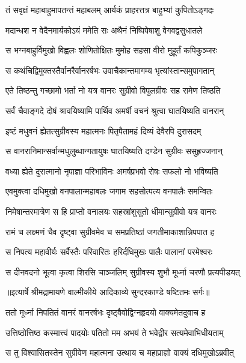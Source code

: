\twolineshloka
{तं सवृक्षं महाबाहुमापतन्तं महाबलम्}
{आर्यकं प्राहरत्तत्र बाहुभ्यां कुपितोऽङ्गदः} %

\twolineshloka
{मदान्धश न वेदैनमार्यकोऽयं ममेति सः}
{अथैनं निष्पिपेषाशु वेगवद्वसुधातले} %

\twolineshloka
{स भग्नबाहुर्विमुखो विह्वलः शोणितोक्षितः}
{मुमोह सहसा वीरो मुहूर्तं कपिकुञ्जरः} %

\twolineshloka
{स कथंचिद्विमुक्तस्तैर्वानरैर्वानरर्षभः}
{उवाचैकान्तमागम्य भृत्यांस्तान्समुपागतान्} %

\twolineshloka
{एते तिष्ठन्तु गच्छामो भर्ता नो यत्र वानरः}
{सुग्रीवो विपुलग्रीवः सह रामेण तिष्ठति} %

\twolineshloka
{सर्वं चैवाङ्गदे दोषं श्रावयिष्यामि पार्थिव}
{अमर्षी वचनं श्रुत्वा घातयिष्यति वानरान्} %

\twolineshloka
{इष्टं मधुवनं ह्येतत्सुग्रीवस्य महात्मनः}
{पितृपैतामहं दिव्यं देवैरपि दुरासदम्} %

\twolineshloka
{स वानरानिमान्सर्वान्मधुलुब्धान्गतायुषः}
{घातयिष्यति दण्डेन सुग्रीवः ससुहृज्जनान्} %

\twolineshloka
{वध्या ह्येते दुरात्मानो नृपाज्ञा परिभाविनः}
{अमर्षप्रभवो रोषः सफलो नो भविष्यति} %

\twolineshloka
{एवमुक्त्वा दधिमुखो वनपालान्महाबलः}
{जगाम सहसोत्पत्य वनपालैः समन्वितः} %

\twolineshloka
{निमेषान्तरमात्रेण स हि प्राप्तो वनालयः}
{सहस्रांशुसुतो धीमान्सुग्रीवो यत्र वानरः} %

\twolineshloka
{रामं च लक्ष्मणं चैव दृष्ट्वा सुग्रीवमेव च}
{समप्रतिष्ठां जगतीमाकाशान्निपपात ह} %

\twolineshloka
{स निपत्य महावीर्यः सर्वैस्तैः परिवारितः}
{हरिर्दधिमुखः पालैः पालानां परमेश्वरः} %

\twolineshloka
{स दीनवदनो भूत्वा कृत्वा शिरसि चाञ्जलिम्}
{सुग्रीवस्य शुभौ मूर्ध्ना चरणौ प्रत्यपीडयत्} %


{॥इत्यार्षे श्रीमद्रामायणे वाल्मीकीये आदिकाव्ये सुन्दरकाण्डे षष्टितमः सर्गः॥}


\twolineshloka
{ततो मूर्ध्ना निपतितं वानरं वानरर्षभः}
{दृष्ट्वैवोद्विग्नहृदयो वाक्यमेतदुवाच ह} %

\twolineshloka
{उत्तिष्ठोत्तिष्ठ कस्मात्त्वं पादयोः पतितो मम}
{अभयं ते भवेद्वीर सत्यमेवाभिधीयताम्} %

\twolineshloka
{स तु विश्वासितस्तेन सुग्रीवेण महात्मना}
{उत्थाय च महाप्राज्ञो वाक्यं दधिमुखोऽब्रवीत्} %


